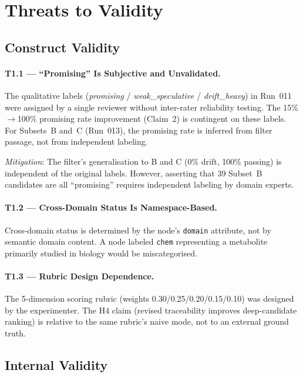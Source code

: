 \section{Threats to Validity}
\label{sec:threats}

\subsection{Construct Validity}

\paragraph{T1.1 --- ``Promising'' Is Subjective and Unvalidated.}
The qualitative labels (\textit{promising} / \textit{weak\_speculative} /
\textit{drift\_heavy}) in Run~011 were assigned by a single reviewer without
inter-rater reliability testing.
The 15\%$\to$100\% promising rate improvement (Claim~2) is contingent on these labels.
For Subsets~B and~C (Run~013), the promising rate is inferred from filter passage,
not from independent labeling.

\textit{Mitigation}: The filter's generalisation to B and C (0\% drift, 100\% passing)
is independent of the original labels. However, asserting that 39 Subset~B candidates
are all ``promising'' requires independent labeling by domain experts.

\paragraph{T1.2 --- Cross-Domain Status Is Namespace-Based.}
Cross-domain status is determined by the node's \texttt{domain} attribute, not by
semantic domain content.
A node labeled \texttt{chem} representing a metabolite primarily studied in biology
would be miscategorised.

\paragraph{T1.3 --- Rubric Design Dependence.}
The 5-dimension scoring rubric (weights 0.30/0.25/0.20/0.15/0.10) was designed by
the experimenter.
The H4 claim (revised traceability improves deep-candidate ranking) is relative to
the same rubric's naive mode, not to an external ground truth.

\subsection{Internal Validity}

